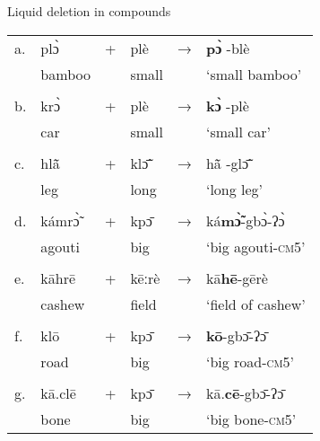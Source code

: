 \documentclass[output=paper]{langscibook}
\begin{document}
 \begin{exe}
     \ex Liquid deletion in compounds \label{ex:traore:liquidDeletionCompounds:28}\\
     \begin{tabularx}{.8\textwidth}{l l l l l l }
       a. & plɔ̀      &      +    &  plè  &  →    &    \textbf{pɔ̀ }-blè \\
        & bamboo  &       {}  & small & {}    & `small bamboo'\\
        &        &           &       &       &               \\
        b. & krɔ̀      &       +   &  plè  &  →    &  \textbf{kɔ̀ }-plè\\
        & car     &       {}  &   small   &   &   `small car'\\
        &         &           &       &       &               \\
        c. & hlã̄     &   +       &  klɔ̃̄  &  →    & hã̄ -glɔ̃̄ \\
        & leg     & {}        & long      & {}    & `long leg'\\
        &        &           &       &       &               \\
        d. & kámrɔ̃̀ &  +    & kpɔ̄       &  →    &  ká\textbf{mɔ̃̀}{}-gbɔ̀-ʔɔ̀\\
        & agouti      &       & big       &       &   `big agouti-\textsc{cm}5'\\
        &         &           &       &       &               \\
        e. & kāhrē   &   +      &    kēːrè   &   →   & kā\textbf{hē}{}-gērè \\
        & cashew  &           &  field    &       & `field of cashew'\\
        &        &           &       &       &               \\
       f. & klō      &   +       &   kpɔ̄     &   →  & \textbf{kō}{}-gbɔ̄-ʔɔ̄  \\ 
        & road    &           & big       &       & `big road-\textsc{cm}5'\\
         &       &           &       &       &               \\
        g. & kā.clē  &   +       &   kpɔ̄      &   →  & kā.\textbf{cē}{}-gbɔ̄-ʔɔ̄  \\
        & bone    &           &   big     &       & `big bone-\textsc{cm}5'\\
     \end{tabularx}
 \end{exe}
\end{document}

